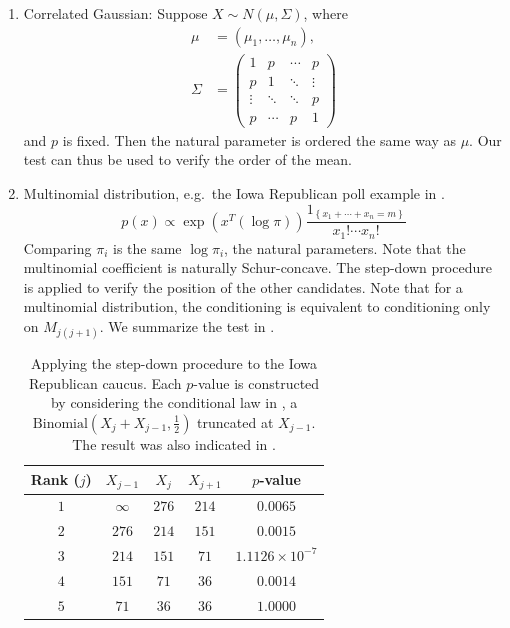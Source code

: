\documentclass[11pt]{article}
\begin{document}
\begin{enumerate}

\item Correlated Gaussian: Suppose $X \sim N\left(\mu, \Sigma\right)$, where
\begin{align*}
\mu & = \left(\mu_1, \ldots, \mu_n\right), \\
\Sigma & = \begin{pmatrix}
1 & p & \cdots & p \\
p & 1 & \ddots & \vdots \\
\vdots & \ddots & \ddots & p \\
p & \cdots & p & 1
\end{pmatrix}
\end{align*}
and $p$ is fixed. Then the natural parameter is ordered the same way as $\mu$. Our test can thus be used to verify the order of the mean.

\item Multinomial distribution, e.g.\ the Iowa Republican poll example in .
$$p\left(x\right) \propto \exp\left(x^T \left(\log \pi\right)\right) \frac{1_{\left\{x_1 + \cdots + x_n = m\right\}}}{x_1! \cdots x_n!}$$
Comparing $\pi_i$ is the same $\log \pi_i$, the natural parameters. Note that the multinomial coefficient is naturally Schur-concave. The step-down procedure is applied to verify the position of the other candidates. Note that for a multinomial distribution, the conditioning  is equivalent to conditioning only on $M_{j\left(j+1\right)}$. We summarize the test in .

\begin{table}[htbp]
\begin{center}
\begin{tabular}{c c c c c}
\hline
Rank ($j$) & $X_{j-1}$ & $X_j$ & $X_{j+1}$ & $p$-value \\
\hline
$1$ & $\infty$ & $276$ & $214$ & $0.0065$ \\
$2$ & $276$ & $214$ & $151$ & $0.0015$ \\
$3$ & $214$ & $151$ & $71$ & $1.1126 \times 10^{-7}$ \\
$4$ & $151$ & $71$ & $36$ & $0.0014$ \\
$5$ & $71$ & $36$ & $36$ & $1.0000$ \\
\hline
\end{tabular}
\end{center}
\caption{Applying the step-down procedure to the Iowa Republican caucus. Each $p$-value is constructed by considering the conditional law in , a $\text{Binomial}\left(X_j + X_{j-1}, \frac{1}{2}\right)$ truncated at $X_{j-1}$. The result was also indicated in .}
\label{tbl:poll_analysis}
\end{table}


\end{enumerate}
\end{document}
